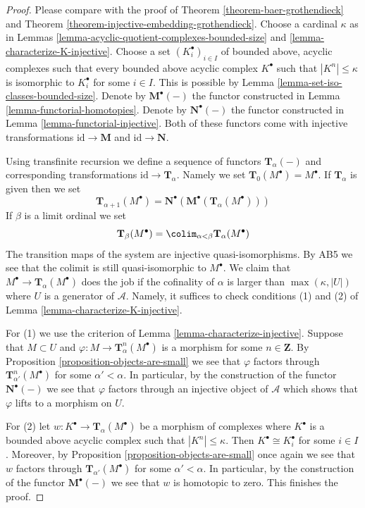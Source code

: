 \begin{proof}
Please compare with the proof of
Theorem \ref{theorem-baer-grothendieck}
and
Theorem \ref{theorem-injective-embedding-grothendieck}.
Choose a cardinal $\kappa$ as in
Lemmas \ref{lemma-acyclic-quotient-complexes-bounded-size} and
\ref{lemma-characterize-K-injective}.
Choose a set $(K_i^\bullet)_{i \in I}$
of bounded above, acyclic complexes
such that every bounded above acyclic complex $K^\bullet$
such that $|K^n| \leq \kappa$ is isomorphic to $K_i^\bullet$ for some
$i \in I$. This is possible by
Lemma \ref{lemma-set-iso-classes-bounded-size}.
Denote by $\mathbf{M}^\bullet(-)$ the functor constructed in
Lemma \ref{lemma-functorial-homotopies}.
Denote by $\mathbf{N}^\bullet(-)$ the functor constructed in
Lemma \ref{lemma-functorial-injective}.
Both of these functors come with injective transformations
$\text{id} \to \mathbf{M}$ and $\text{id} \to \mathbf{N}$.

\medskip\noindent
Using transfinite recursion we define a sequence of functors
$\mathbf{T}_\alpha(-)$ and corresponding transformations
$\text{id} \to \mathbf{T}_\alpha$. Namely we set
$\mathbf{T}_0(M^\bullet) = M^\bullet$. If $\mathbf{T}_\alpha$ is
given then we set
$$
\mathbf{T}_{\alpha + 1}(M^\bullet) =
\mathbf{N}^\bullet(\mathbf{M}^\bullet(\mathbf{T}_\alpha(M^\bullet)))
$$
If $\beta$ is a limit ordinal we set
$$
\mathbf{T}_\beta(M^\bullet) =
\colim_{\alpha < \beta} \mathbf{T}_\alpha(M^\bullet)
$$
The transition maps of the system are injective quasi-isomorphisms.
By AB5 we see that the colimit is still quasi-isomorphic to $M^\bullet$.
We claim that $M^\bullet \to \mathbf{T}_\alpha(M^\bullet)$
does the job if the cofinality of $\alpha$ is larger than
$\max(\kappa, |U|)$ where $U$ is a generator of $\mathcal{A}$.
Namely, it suffices to check conditions (1) and (2) of
Lemma \ref{lemma-characterize-K-injective}.

\medskip\noindent
For (1) we use the criterion of
Lemma \ref{lemma-characterize-injective}.
Suppose that $M \subset U$ and $\varphi : M \to \mathbf{T}^n_\alpha(M^\bullet)$
is a morphism for some $n \in \mathbf{Z}$. By
Proposition \ref{proposition-objects-are-small}
we see that $\varphi$ factors through
$\mathbf{T}^n_{\alpha'}(M^\bullet)$ for some $\alpha' < \alpha$.
In particular, by the construction of the functor
$\mathbf{N}^\bullet(-)$ we see that $\varphi$ factors through
an injective object of $\mathcal{A}$ which shows that $\varphi$
lifts to a morphism on $U$.

\medskip\noindent
For (2) let $w : K^\bullet  \to \mathbf{T}_\alpha(M^\bullet)$
be a morphism of complexes where $K^\bullet$ is a bounded above acyclic
complex such that $|K^n| \leq \kappa$. Then $K^\bullet \cong K_i^\bullet$
for some $i \in I$. Moreover, by
Proposition \ref{proposition-objects-are-small}
once again we see that $w$ factors through
$\mathbf{T}_{\alpha'}(M^\bullet)$ for some $\alpha' < \alpha$.
In particular, by the construction of the functor
$\mathbf{M}^\bullet(-)$ we see that $w$ is homotopic to zero.
This finishes the proof.
\end{proof}







